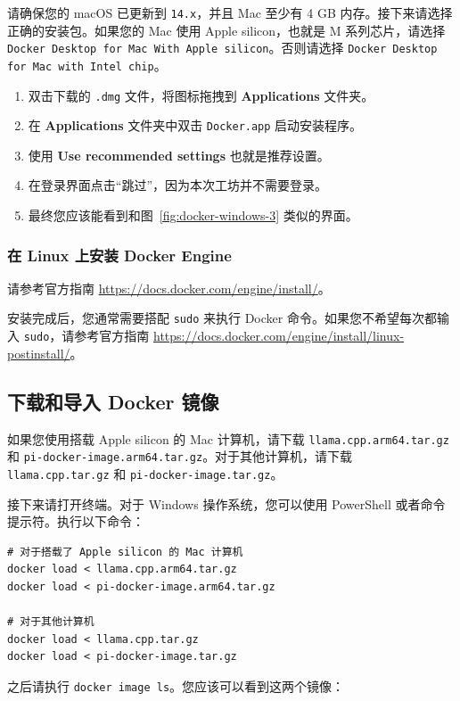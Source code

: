 \documentclass[a4paper,12pt]{article}
\newcommand{\code}[1]{\texttt{\nolinkurl{#1}}}
\begin{document}
请确保您的 macOS 已更新到 \texttt{14.x}，并且 Mac 至少有 4 GB 内存。接下来请选择正确的安装包。如果您的 Mac 使用 Apple silicon，也就是 M 系列芯片，请选择 \texttt{Docker Desktop for Mac With Apple silicon}。否则请选择 \texttt{Docker Desktop for Mac with Intel chip}。

\begin{enumerate}
\item 双击下载的 \texttt{.dmg} 文件，将图标拖拽到 \textbf{Applications} 文件夹。
\item 在 \textbf{Applications} 文件夹中双击 \texttt{Docker.app} 启动安装程序。
\item 使用 \textbf{Use recommended settings} 也就是推荐设置。
\item 在登录界面点击“跳过”，因为本次工坊并不需要登录。
\item 最终您应该能看到和图~\ref{fig:docker-windows-3} 类似的界面。
\end{enumerate}

\subsubsection{在 Linux 上安装 Docker Engine}

请参考官方指南 \url{https://docs.docker.com/engine/install/}。

安装完成后，您通常需要搭配 \texttt{sudo} 来执行 Docker 命令。如果您不希望每次都输入 \texttt{sudo}，请参考官方指南 \url{https://docs.docker.com/engine/install/linux-postinstall/}。

\subsection{下载和导入 Docker 镜像}

如果您使用搭载 Apple silicon 的 Mac 计算机，请下载 \code{llama.cpp.arm64.tar.gz} 和 \code{pi-docker-image.arm64.tar.gz}。对于其他计算机，请下载 \code{llama.cpp.tar.gz} 和 \code{pi-docker-image.tar.gz}。

接下来请打开终端。对于 Windows 操作系统，您可以使用 PowerShell 或者命令提示符。执行以下命令：

\begin{verbatim}
# 对于搭载了 Apple silicon 的 Mac 计算机
docker load < llama.cpp.arm64.tar.gz
docker load < pi-docker-image.arm64.tar.gz

# 对于其他计算机
docker load < llama.cpp.tar.gz
docker load < pi-docker-image.tar.gz
\end{verbatim}

之后请执行 \verb|docker image ls|。您应该可以看到这两个镜像：
\end{document}
